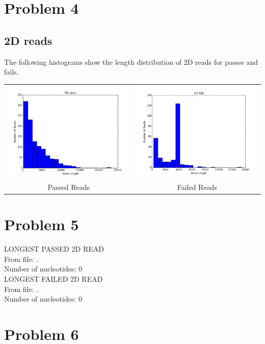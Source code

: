 \documentclass[11pt]{article}
\begin{document}
\section*{Problem 4}
\subsection*{2D reads}

        The following histograms show the length distribution of 2D reads for passes and fails.

        
        \begin{tabular}{cc}
          \includegraphics[width=.48\textwidth]{2Dpasses}
          &
          \includegraphics[width=.48\textwidth]{2Dfailures}
          \\
          Passed Reads
          &
          Failed Reads
        \end{tabular}
\section*{Problem 5}

LONGEST PASSED 2D READ\\
From file: .\\
Number of nucleotides: 0\\

LONGEST FAILED 2D READ\\
From file: .\\
Number of nucleotides: 0\\
\section*{Problem 6}
\end{document}
